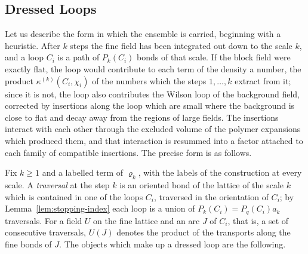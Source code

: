 \documentclass[11pt]{preprint}
\numberwithin{equation}{section}
\theoremstyle{definition}
\theoremstyle{remark}
\theoremstyle{plain}
\begin{document}
\subsection{Dressed Loops}\label{sec:dressed-loops}

Let us describe the form in which the ensemble is carried, beginning with a heuristic. After $k$ steps the fine field has been integrated out down to the scale $k$, and a loop $C_i$ is a path of $P_k(C_i)$ bonds of that scale. If the block field were exactly flat, the loop would contribute to each term of the density a number, the product $\kappa^{(k)}(C_i, \chi_i)$ of the numbers which the steps $1, \dots, k$ extract from it; since it is not, the loop also contributes the Wilson loop of the background field, corrected by insertions along the loop which are small where the background is close to flat and decay away from the regions of large fields. The insertions interact with each other through the excluded volume of the polymer expansions which produced them, and that interaction is resummed into a factor attached to each family of compatible insertions. The precise form is as follows.

Fix $k \geq 1$ and a labelled term of $\varrho_k$, with the labels of the construction at every scale. A \emph{traversal} at the step $k$ is an oriented bond of the lattice of the scale $k$ which is contained in one of the loops $C_i$, traversed in the orientation of $C_i$; by Lemma~\ref{lem:stopping-index} each loop is a union of $P_k(C_i) = P_q(C_i)a_k$ traversals. For a field $U$ on the fine lattice and an arc $J$ of $C_i$, that is, a set of consecutive traversals, $U(J)$ denotes the product of the transports along the fine bonds of $J$. The objects which make up a dressed loop are the following.
\end{document}
